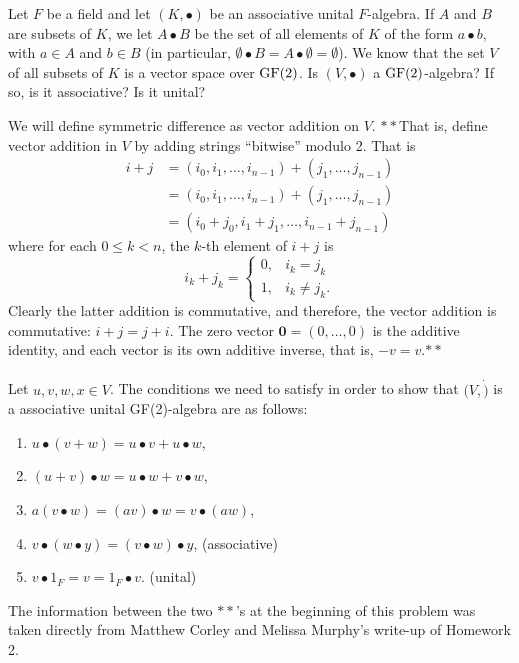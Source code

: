 \maketitle

\begin{ProbBox} %
\begin{problem}[Golan 124]
Let $F$ be a field and let $(K, \bullet)$ be an associative unital
$F$-algebra.  If $A$ and $B$ are subsets of $K$, we let $A\bullet B$ be the set
of all elements of $K$ of the form $a \bullet b$, with $a \in A$ and $b \in B$
(in particular, $\emptyset \bullet B = A \bullet \emptyset = \emptyset$).
We know that the set $V$ of all subsets of $K$ is a vector space over $\operatorname{GF}(2)$.
Is $(V, \bullet)$ a $\operatorname{GF}(2)$-algebra?  If so, is it associative?  Is it unital?
\end{problem}
\smallskip
\begin{solution}
We will define symmetric difference as vector addition on $V$. $**$That is, define vector addition in $V$ by adding strings ``bitwise'' modulo 2.  That is
\begin{align*}
i+ j &= (i_0, i_1, \dots, i_{n-1}) + (j_1, \dots, j_{n-1})\\
&= (i_0, i_1, \dots, i_{n-1}) + (j_1, \dots, j_{n-1})\\
&= (i_0+j_0, i_1+j_1, \dots, i_{n-1}+j_{n-1})
\end{align*}
where for each $0\leq k < n$, the $k$-th element of $i+j$ is
\[
i_k + j_k =
\begin{cases}
  0, &i_k = j_k\\
  1, &i_k \neq j_k.
\end{cases}
\]
Clearly the latter addition is commutative, and therefore, the vector addition is
commutative: $i+j = j+i$.  The zero vector $\mathbf{0} = (0, \dots, 0)$ 
is the additive identity, and each vector is its own additive inverse, that is, 
$-v = v$.$**$ \\ \\
Let $u,v,w,x \in V$. The conditions we need to satisfy in order to show that $(V,\dot)$ is a associative unital GF(2)-algebra are as follows: \\
\begin{enumerate}
  \item $u \bullet (v+w) = u \bullet v + u \bullet w$, 
  \item $(u+v) \bullet w = u \bullet w + v \bullet w$, 
  \item $a(v \bullet w) = (av) \bullet w = v \bullet (aw)$, 
  \item $v \bullet (w \bullet y) = (v \bullet w) \bullet y$, (associative)
  \item $v \bullet 1_F = v = 1_F \bullet v$. (unital) \\
\end{enumerate}
The information between the two $**$'s at the beginning of this problem was taken directly from Matthew Corley and Melissa Murphy's write-up of Homework 2.

\end{solution}
\end{ProbBox}
\probskip

